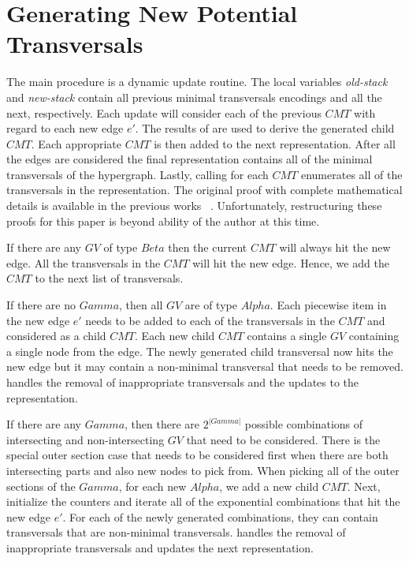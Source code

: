 \section{Generating New Potential Transversals}

The main procedure  is a dynamic update routine. The local variables \emph{old-stack} and \emph{new-stack} contain all previous minimal transversals encodings and all the next, respectively. Each update will consider each of the previous $CMT$ with regard to each new edge $e'$. The results of  are used to derive the generated child $CMT$. Each appropriate $CMT$ is then added to the next representation. After all the edges are considered the final representation contains all of the minimal transversals of the hypergraph.  Lastly, calling  for each $CMT$ enumerates all of the transversals in the representation. The original proof with complete mathematical details is available in the previous works ~\cite{kavvadias2005efficient}. Unfortunately, restructuring these proofs for this paper is beyond ability of the author at this time.

If there are any $GV$ of type $Beta$ then the current $CMT$ will always hit the new edge. All the transversals in the $CMT$ will hit the new edge. Hence, we add the $CMT$ to the next list of transversals.

If there are no $Gamma$, then all $GV$ are of type $Alpha$. Each piecewise item in the new edge $e'$ needs to be added to each of the transversals in the $CMT$ and considered as a child $CMT$. Each new child $CMT$ contains a single $GV$ containing a single node from the edge. The newly generated child transversal now hits the new edge but it may contain a non-minimal transversal that needs to be removed.  handles the removal of inappropriate transversals and the updates to the representation. 

If there are any $Gamma$, then there are $2^{|Gamma|}$ possible combinations of intersecting and non-intersecting $GV$ that need to be considered. There is the special outer section case that needs to be considered first when there are both intersecting parts and also new nodes to pick from. When picking all of the outer sections of the $Gamma$, for each new $Alpha$, we add a new child $CMT$. Next, initialize the counters and iterate all of the exponential combinations that hit the new edge $e'$. For each of the newly generated combinations, they can contain transversals that are non-minimal transversals.  handles the removal of inappropriate transversals and updates the next representation. 

